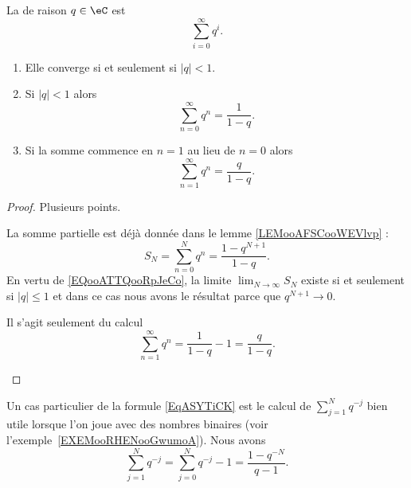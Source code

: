 \begin{propositionDef}      \label{PROPooWOWQooWbzukS}
	La  de raison \( q \in \eC\) est
	\begin{equation}    \label{EqZQTGooIWEFxL}
		\sum_{i=0}^\infty q^i.
	\end{equation}
	\begin{enumerate}
		\item       \label{ITEMooAFAMooGuXqBm}
		      Elle converge si et seulement si \( | q |<1\).
		\item       \label{ITEMooBJHBooBMEmiG}
		      Si \( | q |<1\) alors
		      \begin{equation}    \label{EqRGkBhrX}
			      \sum_{n=0}^{\infty}q^n=\frac{ 1 }{ 1-q }.
		      \end{equation}
		\item       \label{ITEMooVZHKooNGpDkx}
		      Si la somme commence en \( n=1\) au lieu de \( n=0\) alors
		      \begin{equation}        \label{EqPZOWooMdSRvY}
			      \sum_{n=1}^{\infty}q^n=\frac{ q }{ 1-q }.
		      \end{equation}
	\end{enumerate}
\end{propositionDef}

\begin{proof}
	Plusieurs points.
	\begin{subproof}
		La somme partielle est déjà donnée dans le lemme \ref{LEMooAFSCooWEVlvp} :
		\begin{equation}
			S_N=\sum_{n=0}^Nq^n=\frac{ 1-q^{N+1} }{ 1-q }.
		\end{equation}
		En vertu de \eqref{EQooATTQooRpJeCo}, la limite \( \lim_{N\to \infty} S_N\) existe si et seulement si \( | q |\leq 1\) et dans ce cas nous avons le résultat parce que \( q^{N+1}\to 0\).

		Il s'agit seulement du calcul
		\begin{equation}
			\sum_{n=1}^{\infty}q^n=\frac{1}{ 1-q }-1=\frac{ q }{ 1-q }.
		\end{equation}
	\end{subproof}
\end{proof}

Un cas particulier de la formule \eqref{EqASYTiCK} est le calcul de \( \sum_{j=1}^{N}q^{-j}\) bien utile lorsque l'on joue avec des nombres binaires (voir l'exemple~\ref{EXEMooRHENooGwumoA}). Nous avons
\begin{equation}        \label{EQooFMBAooEJkHWT}
	\sum_{j=1}^Nq^{-j}=\sum_{j=0}^Nq^{-j}-1=\frac{ 1-q^{-N} }{ q-1 }.
\end{equation}

